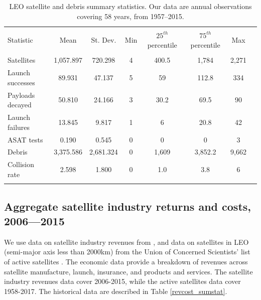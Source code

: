 \documentclass[12pt]{article}
\begin{document}
\begin{table}[!htbp] \centering 
	\caption[LEO satellite and debris summary statistics]{LEO satellite and debris summary statistics. Our data are annual observations covering 58 years, from 1957--2015.} 
	\label{physstock_sumstat} 
	\hspace*{-1cm}
	\begin{tabular}{@{\extracolsep{5pt}}lccccccc} 
		\\[-1.8ex]\hline 
		\hline \\[-1.8ex] 
		Statistic & \multicolumn{1}{c}{Mean} & \multicolumn{1}{c}{St. Dev.} & \multicolumn{1}{c}{Min} & \multicolumn{1}{c}{$25^{th}$ percentile} & \multicolumn{1}{c}{$75^{th}$ percentile} & \multicolumn{1}{c}{Max} \\ 
		\hline \\[-1.8ex] 
		Satellites & 1,057.897 & 720.298 & 4 & 400.5 & 1,784 & 2,271 \\ 
		Launch successes & 89.931 & 47.137 & 5 & 59 & 112.8 & 334 \\ 
		Payloads decayed & 50.810 & 24.166 & 3 & 30.2 & 69.5 & 90 \\ 
		Launch failures & 13.845 & 9.817 & 1 & 6 & 20.8 & 42 \\ 
		ASAT tests & 0.190 & 0.545 & 0 & 0 & 0 & 3 \\ 
		Debris & 3,375.586 & 2,681.324 & 0 & 1,609 & 3,852.2 & 9,662 \\ 
		Collision rate & 2.598 & 1.800 & 0 & 1.0 & 3.8 & 6 \\ 
		\hline \\[-1.8ex] 
	\end{tabular} 
\end{table} 


\subsection{Aggregate satellite industry returns and costs, 2006---2015}

We use data on satellite industry revenues from \citet{wienzierl2018}, and data on satellites in LEO (semi-major axis less than 2000km) from the Union of Concerned Scientists' list of active satellites \citep{UCSdata}. The economic data provide a breakdown of revenues across satellite manufacture, launch, insurance, and products and services. The satellite industry revenues data cover 2006-2015, while the active satellites data cover 1958-2017. The historical data are described in Table \ref{revcost_sumstat}. \\
\end{document}
